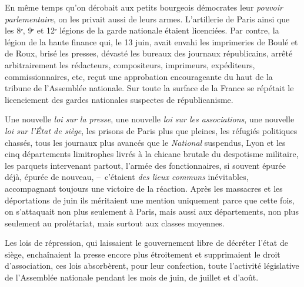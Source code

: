 \documentclass[french,twoside]{book} %
\begin{document}
En même temps qu’on dérobait aux petits bourgeois démocrates leur \emph{pouvoir parlementaire}, on les privait aussi de leurs armes. L’artillerie de Paris ainsi que les 8ᵉ, 9ᵉ et 12ᵉ légions de la garde nationale étaient licenciées. Par contre, la légion de la haute finance qui, le 13 juin, avait envahi les imprimeries de Boulé et de Roux, brisé les presses, dévasté les bureaux des journaux républicains, arrêté arbitrairement les rédacteurs, compositeurs, imprimeurs, expéditeurs, commissionnaires, etc, reçut une approbation encourageante du haut de la tribune de l’Assemblée nationale. Sur toute la surface de la France se répétait le licenciement des gardes nationales suspectes de républicanisme.\par
Une nouvelle \emph{loi sur la presse}, une nouvelle \emph{loi sur les associations}, une nouvelle \emph{loi sur l’État de siège}, les prisons de Paris plus que pleines, les réfugiés politiques chassés, tous les journaux plus avancés que le \emph{National} suspendus, Lyon et les cinq départements limitrophes livrés à la chicane brutale du despotisme militaire, les parquets intervenant partout, l’armée des fonctionnaires, si souvent épurée déjà, épurée de nouveau, – c’étaient \emph{des lieux communs} inévitables, accompagnant toujours une victoire de la réaction. Après les massacres et les déportations de juin ils méritaient une mention uniquement parce que cette fois, on s’attaquait non plus seulement à Paris, mais aussi aux départements, non plus seulement au prolétariat, mais surtout aux classes moyennes.\par
Les lois de répression, qui laissaient le gouvernement libre de décréter l’état de siège, enchaînaient la presse encore plus étroitement et supprimaient le droit d’association, ces lois absorbèrent, pour leur confection, toute l’activité législative de l’Assemblée nationale pendant les mois de juin, de juillet et d’août.\par
\end{document}

